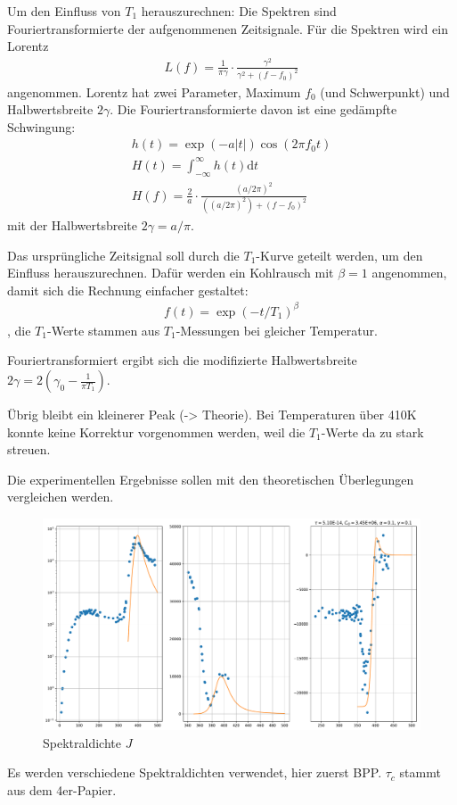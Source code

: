 Um den Einfluss von $T_1$ herauszurechnen: Die Spektren sind Fouriertransformierte der aufgenommenen Zeitsignale. Für die Spektren wird ein Lorentz
\begin{align}
	L(f) = \frac{1}{\pi \gamma} \cdot \frac{\gamma^2}{\gamma^2 + (f - f_0)^2}
\end{align}
angenommen. Lorentz hat zwei Parameter, Maximum $f_0$ (und Schwerpunkt) und Halbwertsbreite $2\gamma$. Die Fouriertransformierte davon ist eine gedämpfte Schwingung:
\begin{align}
	h(t) = \exp{(-a |t|)} \cos{(2 \pi f_0 t)}      \\
	H(t) = \int_{-\infty}^{\infty} h(t) \text{d} t \\
	H(f) = \frac{2}{a} \cdot \frac{(a/2\pi)^2}{((a/2\pi)^2) + (f - f_0)^2}
\end{align}
mit der Halbwertsbreite $2 \gamma = a/\pi$.

Das ursprüngliche Zeitsignal soll durch die $T_1$-Kurve geteilt werden, um den Einfluss herauszurechnen. Dafür werden ein Kohlrausch mit $\beta = 1$ angenommen, damit sich die Rechnung einfacher gestaltet:
\begin{align}
	f(t) = \exp{(-t/T_1)^\beta}
\end{align}
, die $T_1$-Werte stammen aus $T_1$-Messungen bei gleicher Temperatur.

Fouriertransformiert ergibt sich die modifizierte Halbwertsbreite $2\gamma = 2(\gamma_0 - \frac{1}{\pi T_1})$.

Übrig bleibt ein kleinerer Peak (-> Theorie). Bei Temperaturen über 410K konnte keine Korrektur vorgenommen werden, weil die $T_1$-Werte da zu stark streuen.








Die experimentellen Ergebnisse sollen mit den theoretischen Überlegungen vergleichen werden.

\begin{figure}
	\begin{center}
		\includegraphics[width=\textwidth]{graphics/plots/THEO/J_01.pdf}
	\end{center}
	\caption{Spektraldichte $J$} \label{fig:res:theorie_j}
\end{figure}
Es werden verschiedene Spektraldichten verwendet, hier zuerst BPP. $\tau_c$ stammt aus dem 4er-Papier.

